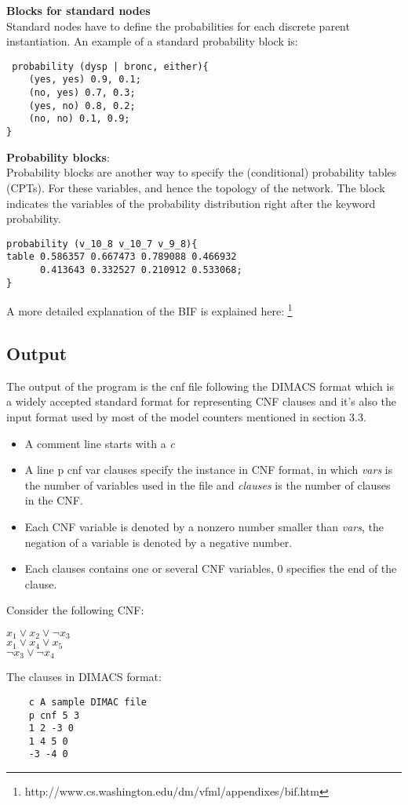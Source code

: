 \noindent \textbf{Blocks for standard nodes}\\
Standard nodes have to define the probabilities for each discrete parent instantiation. An example of a standard probability block is: 
\begin{lstlisting}
 probability (dysp | bronc, either){
    (yes, yes) 0.9, 0.1;
    (no, yes) 0.7, 0.3;
    (yes, no) 0.8, 0.2;
    (no, no) 0.1, 0.9;
}
\end{lstlisting}

\noindent \textbf{Probability blocks}:\\
Probability blocks are another way to specify the (conditional) probability tables (CPTs). For these variables, and hence the topology of the network. The block indicates the variables of the probability distribution right after the keyword probability.
\begin{lstlisting}
probability (v_10_8 v_10_7 v_9_8){ 
table 0.586357 0.667473 0.789088 0.466932 
      0.413643 0.332527 0.210912 0.533068;
}
\end{lstlisting}
A more detailed explanation of the BIF is explained here: \footnote{http://www.cs.washington.edu/dm/vfml/appendixes/bif.htm} \\

\subsection{Output}
The output of the program is the cnf file following the DIMACS format which is a widely accepted standard format for representing CNF clauses and it's also the input format used by most of the model counters mentioned in section 3.3.\\
\begin{itemize}
    \item A comment line starts with a \textit{c}
    \item A line p cnf var clauses specify the instance in CNF format, in which \textit{vars} is the number of variables used in the file and \textit{clauses} is the number of clauses in the CNF.
    \item Each CNF variable is denoted by a non\-zero number smaller than \textit{vars}, the negation of a variable is denoted by a negative number.
    \item Each clauses contains one or several CNF variables, 0 specifies the end of the clause.
\end{itemize}

Consider the following CNF:
\begin{center}
    $x_{1} \vee x_{2} \vee \neg x_{3}$\\
    $x_{1} \vee x_{4} \vee x_{5}$\\
    $\neg x_{3} \vee \neg x_{4}$\\  
\end{center}
The clauses in DIMACS format:
\begin{center}
    \begin{lstlisting}
    c A sample DIMAC file
    p cnf 5 3
    1 2 -3 0
    1 4 5 0
    -3 -4 0
    \end{lstlisting}
\end{center}